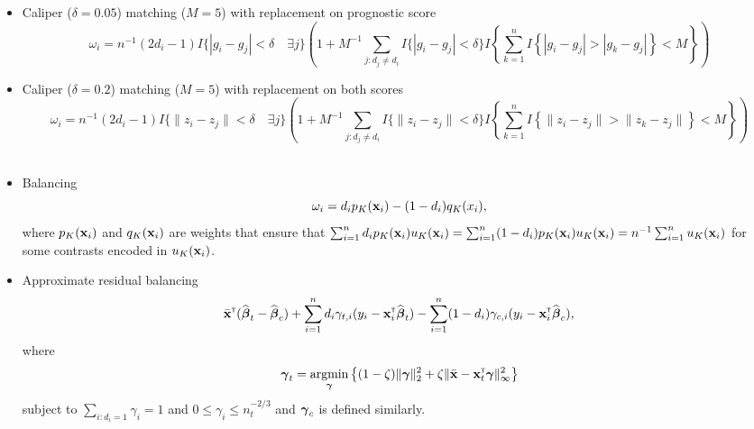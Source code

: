 \documentclass[]{article}
\begin{document}
\begin{itemize}
\item
  Caliper (\(\delta = 0.05\)) matching (\(M = 5\)) with replacement on
  prognostic score
  \[ \omega_i = n^{-1}(2d_i - 1)I\{|g_i - g_j| < \delta \quad \exists j\}\left(1 + M^{-1}\sum_{j: d_j \neq d_i} I\{|g_i - g_j| < \delta\}I\left\{\sum_{k=1}^n I\left\{|g_i - g_j| > |g_k - g_j|\right\} < M\right\}\right) \]
\item
  Caliper (\(\delta = 0.2\)) matching (\(M = 5\)) with replacement on
  both scores
  \[ \omega_i = n^{-1}(2d_i - 1)I\{\|z_i - z_j\| < \delta \quad \exists j\}\left(1 + M^{-1}\sum_{j: d_j \neq d_i} I\{\|z_i - z_j\| < \delta\}I\left\{\sum_{k=1}^n I\left\{\|z_i - z_j\| > \|z_k - z_j\|\right\} < M\right\}\right) \]\\
\item
  Balancing \[ \omega_i = d_ip_K({\bf x}_i) - (1-d_i)q_K(x_i), \] where
  \(p_K({\bf x}_i)\) and \(q_K({\bf x}_i)\) are weights that ensure that
  \(\sum_{i=1}^n d_ip_K({\bf x}_i)u_K({\bf x}_i) = \sum_{i=1}^n (1-d_i)p_K({\bf x}_i)u_K({\bf x}_i) = n^{-1}\sum_{i=1}^n u_K({\bf x}_i)\)
  for some contrasts encoded in \(u_K({\bf x}_i)\).
\item
  Approximate residual balancing \[
  \bar{{\bf x}}^{{\sf \scriptscriptstyle{T}}}({\widehat{\boldsymbol{\beta}}}_t - {\widehat{\boldsymbol{\beta}}}_c) + \sum_{i=1}^n d_i\gamma_{t,i}(y_i - {\bf x}_i^{{\sf \scriptscriptstyle{T}}}{\widehat{\boldsymbol{\beta}}}_t) - \sum_{i=1}^n (1-d_i)\gamma_{c,i}(y_i - {\bf x}_i^{{\sf \scriptscriptstyle{T}}}{\widehat{\boldsymbol{\beta}}}_c),\]
  where
  \[\boldsymbol{\gamma}_t = \mathop{\mbox{argmin}}_{\boldsymbol{\gamma}} \left\{(1-\zeta)\|\boldsymbol{\gamma}\|_2^2 + \zeta\|\bar{{\bf x}} - {\bf x}_t^{{\sf \scriptscriptstyle{T}}}\boldsymbol{\gamma}\|_\infty^2\right\}\]
  subject to \(\sum_{i : d_i = 1} \gamma_i = 1\) and
  \(0 \leq \gamma_i \leq n_t^{-2/3}\) and \(\boldsymbol{\gamma}_c\) is defined
  similarly.
\end{itemize}
\end{document}
